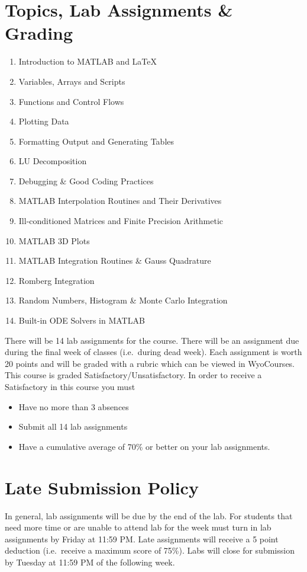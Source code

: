 \documentclass[11pt, letterpaper]{article}
\begin{document}
\section*{Topics, Lab Assignments \& Grading}
\begin{enumerate}
  \setlength\itemsep{0em}
  \item Introduction to MATLAB and \LaTeX{}
  \item Variables, Arrays and Scripts
  \item Functions and Control Flows
  \item Plotting Data
  \item Formatting Output and Generating Tables
  \item LU Decomposition
  \item Debugging \& Good Coding Practices
  \item MATLAB Interpolation Routines and Their Derivatives
  \item Ill-conditioned Matrices and Finite Precision Arithmetic
  \item MATLAB 3D Plots
  \item MATLAB Integration Routines \& Gauss Quadrature
  \item Romberg Integration
  \item Random Numbers, Histogram \& Monte Carlo Integration
  \item Built-in ODE Solvers in MATLAB
\end{enumerate}

There will be 14 lab assignments for the course. There will be an assignment due during the final week of classes (i.e.\ during dead week). Each assignment is worth 20 points and will be graded with a rubric which can be viewed in WyoCourses. This course is graded Satisfactory/Unsatisfactory. In order to receive a Satisfactory in this course you must
\begin{itemize}[itemsep=0pt, topsep=0pt]
  \item Have no more than 3 absences
  \item Submit all 14 lab assignments
  \item Have a cumulative average of 70\% or better on your lab assignments.
\end{itemize}
\section*{Late Submission Policy}
In general, lab assignments will be due by the end of the lab. For students that need more time or are unable to attend lab for the week must turn in lab assignments by Friday at 11:59 PM. Late assignments will receive a 5 point deduction (i.e.\ receive a maximum score of 75\%). Labs will close for submission by Tuesday at 11:59 PM of the following week.
\end{document}
